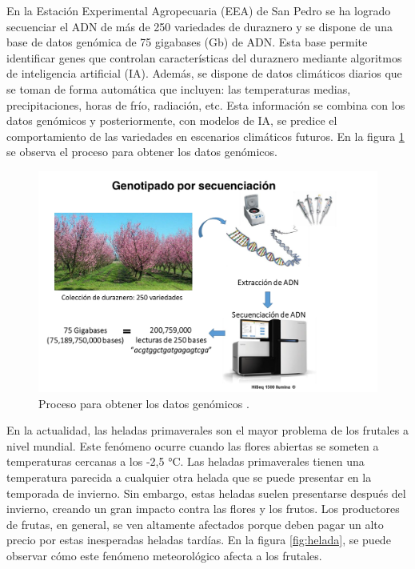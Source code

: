 En la  Estación Experimental Agropecuaria (EEA) de San Pedro se ha logrado secuenciar el ADN de más de 250 variedades de duraznero \cite{ARTICLE:1} y se dispone de una base de datos genómica de 75 gigabases (Gb) de ADN. Esta base permite identificar genes que controlan características del duraznero mediante algoritmos de inteligencia artificial (IA). Además, se dispone de datos climáticos diarios que se toman de forma automática que incluyen: las temperaturas medias, precipitaciones, horas de frío, radiación, etc. Esta información se combina con los datos genómicos y posteriormente, con modelos de IA, se predice el comportamiento de las variedades en escenarios climáticos futuros. En la figura \ref{fig:genotipado} se observa el proceso para obtener los datos genómicos.

\begin{figure}[h]
	\centering
	\includegraphics[scale=.3]{./Figures/genotipado.png}
	\caption{Proceso para obtener los datos genómicos \cite{ARTICLE:1}.}
	\label{fig:genotipado}
\end{figure}
\newpage
En la actualidad, las heladas primaverales son el mayor problema de los frutales a nivel mundial. Este fenómeno ocurre cuando las flores abiertas se someten a temperaturas cercanas a los -2,5 °C. Las heladas primaverales tienen una temperatura parecida a cualquier otra helada que se puede presentar en la temporada de invierno. Sin embargo, estas heladas suelen presentarse después del invierno, creando un gran impacto contra las flores y los frutos. Los productores de frutas, en general, se ven altamente afectados porque deben pagar un alto precio por estas inesperadas heladas tardías. En la figura \ref{fig:helada}, se puede observar cómo este fenómeno meteorológico afecta a los frutales.

